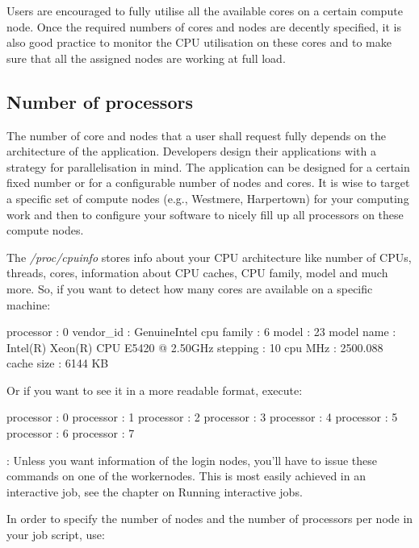 Users are encouraged to fully utilise all the available cores on a certain
compute node. Once the required numbers of cores and nodes are decently
specified, it is also good practice to monitor the CPU utilisation on these
cores and to make sure that all the assigned nodes are working at full load.

\subsection{Number of processors}

The number of core and nodes that a user shall request fully depends on the
architecture of the application. Developers design their applications with a
strategy for parallelisation in mind. The application can be designed for a
certain fixed number or for a configurable number of nodes and cores. It is
wise to target a specific set of compute nodes (e.g., Westmere, Harpertown) for
your computing work and then to configure your software to nicely fill up all
processors on these compute nodes.

The \emph{/proc/cpuinfo} stores info about your CPU architecture like number of
CPUs, threads, cores, information about CPU caches, CPU family, model and much
more.  So, if you want to detect how many cores are available on a specific
machine:

\begin{prompt}
processor       : 0
vendor_id       : GenuineIntel
cpu family      : 6
model           : 23
model name      : Intel(R) Xeon(R) CPU  E5420  @ 2.50GHz
stepping        : 10
cpu MHz         : 2500.088
cache size      : 6144 KB
\end{prompt}

Or if you want to see it in a more readable format, execute:

\begin{prompt}
processor : 0
processor : 1
processor : 2
processor : 3
processor : 4
processor : 5
processor : 6
processor : 7
\end{prompt}

: Unless you want information of the login nodes, you'll have to issue these commands
on one of the workernodes. This is most easily achieved in an interactive job, see the chapter on
Running interactive jobs.

In order to specify the number of nodes and the number of processors per node in your job script, use:

